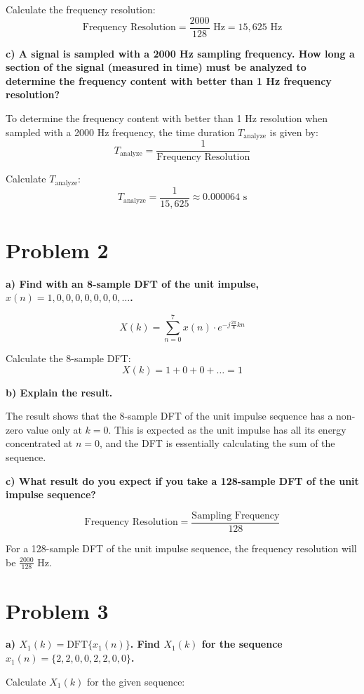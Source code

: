 \documentclass{article}
\begin{document}
Calculate the frequency resolution:
\[ \text{Frequency Resolution} = \frac{2000}{128} \text{ Hz} = 15,625 \text{ Hz} \]

\textbf{c) A signal is sampled with a 2000 Hz sampling frequency. How long a section of the signal (measured in time) must be analyzed to determine the frequency content with better than 1 Hz frequency resolution?}

To determine the frequency content with better than 1 Hz resolution when sampled with a 2000 Hz frequency, the time duration \(T_{\text{analyze}}\) is given by:
\[ T_{\text{analyze}} = \frac{1}{\text{Frequency Resolution}} \]

Calculate \(T_{\text{analyze}}\):
\[ T_{\text{analyze}} = \frac{1}{15,625} \approx 0.000064 \text{ s} \]

\section*{Problem 2}

\textbf{a) Find with an 8-sample DFT of the unit impulse, \(x(n) = 1, 0, 0, 0, 0, 0, 0, 0, \ldots\).}

\[ X(k) = \sum_{n=0}^{7} x(n) \cdot e^{-j \frac{2\pi}{8}kn} \]

Calculate the 8-sample DFT:
\[ X(k) = 1 + 0 + 0 + \ldots = 1 \]

\textbf{b) Explain the result.}

The result shows that the 8-sample DFT of the unit impulse sequence has a non-zero value only at \(k = 0\). This is expected as the unit impulse has all its energy concentrated at \(n = 0\), and the DFT is essentially calculating the sum of the sequence.

\textbf{c) What result do you expect if you take a 128-sample DFT of the unit impulse sequence?}

\[ \text{Frequency Resolution} = \frac{\text{Sampling Frequency}}{128} \]

For a 128-sample DFT of the unit impulse sequence, the frequency resolution will be \( \frac{2000}{128} \) Hz.

\section*{Problem 3}

\textbf{a) \(X_1(k) = \text{DFT}\{x_1(n)\}\). Find \(X_1(k)\) for the sequence \(x_1(n) = \{2, 2, 0, 0, 2, 2, 0, 0\}\).}

Calculate \(X_1(k)\) for the given sequence:
\end{document}
